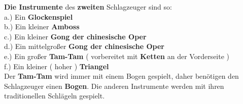 \documentclass[12pt]{article}
\newcommand*\circled[1]{\tikz[baseline=(char.base)]{
            \node[shape=circle,draw,inner sep=1pt] (char) {#1};}}
\begin{document}
\begingroup
\textbf{\circled{2} Die Instrumente} des \textbf{zweiten} Schlagzeuger sind so: \\
a.) Ein \textbf{Glockenspiel} \\
b.) Ein kleiner \textbf{Amboss} \\
c.) Ein kleiner \textbf{Gong der chinesische Oper\setmainfont{Source Han Serif SC Bold}\selectfont{ ( 小鑼 ) } }  \\
d.) Ein mittelgroßer \textbf{Gong der chinesische Oper \setmainfont{Source Han Serif SC Bold}\selectfont{ ( 中型鑼 ) } }\\
e.) Ein großer \textbf{Tam-Tam} ( vorbereitet mit \textbf{Ketten} an der Vorderseite ) \\
f.) Ein kleiner ( hoher ) \textbf{Triangel} \\
Der \textbf{Tam-Tam} wird immer mit einem Bogen gespielt, daher benötigen den Schlagzeuger einen \textbf{Bogen}. Die anderen Instrumente werden mit ihren traditionellen Schlägeln gespielt.
\endgroup
\end{document}
